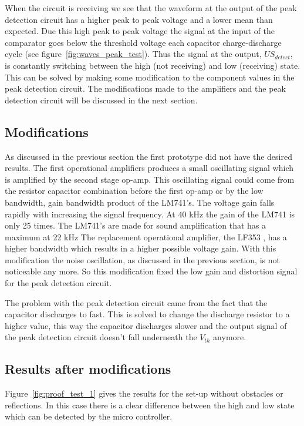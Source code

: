 When the circuit is receiving we see that the waveform at the output of the peak detection circuit has a higher peak to peak voltage and a lower mean than expected.
Due this high peak to peak voltage the signal at the input of the comparator goes below the threshold voltage each capacitor charge-discharge cycle (see figure~\ref{fig:waves_peak_test}).
Thus the signal at the output, $US_{detect}$, is constantly switching between the high (not receiving) and low (receiving) state.
This can be solved by making some modification to the component values in the peak detection circuit.
The modifications made to the amplifiers and the peak detection circuit will be discussed in the next section.


\subsection{Modifications}
\label{chap:mod}
As discussed in the previous section the first prototype did not have the desired results. The first operational amplifiers produces a small oscillating signal which is amplified by the second stage op-amp. This oscillating signal could come from the resistor capacitor combination before the first op-amp or by the low bandwidth, gain bandwidth product of the LM741's. The voltage gain falls rapidly with increasing the signal frequency. At 40 kHz the gain of the LM741 is only 25 times. The LM741's are made for sound amplification that has a maximum at 22 kHz The replacement operational amplifier, the LF353 \cite{LF353}
, has a higher bandwidth which results in a higher possible voltage gain. With this modification the noise oscillation, as discussed in the previous section, is not noticeable any more. So this modification fixed the low gain and distortion signal for the peak detection circuit.

The problem with the peak detection circuit came from the fact that the capacitor discharges to fast. This is solved to change the discharge resistor to a higher value, this way the capacitor discharges slower and the output signal of the peak detection circuit doesn't fall underneath the $V_{th}$ anymore.


\subsection{Results after modifications}

Figure~\ref{fig:proof_test_1} gives the results for the set-up without obstacles or reflections.
In this case there is a clear difference between the high and low state which can be detected by the micro controller.

